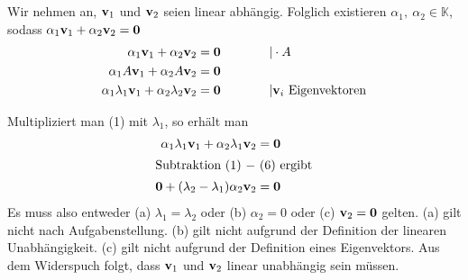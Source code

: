 \documentclass{../mfa}
\begin{document}
\maketitle

\section{}
\subsection{}
Wir nehmen an, $\mathbf{v}_1$ und $\mathbf{v}_2$ seien linear abhängig. Folglich existieren
$\alpha_1,~\alpha_2 \in \mathbb{K}$, sodass $\alpha_1 \mathbf{v}_1 + \alpha_2 \mathbf{v}_2 = \mathbf{0}$
\begin{align}
   \alpha_1 \mathbf{v}_1 + \alpha_2 \mathbf{v}_2 &= \mathbf{0} & \hspace{1cm} & | \cdot A
   \\
   \alpha_1 A \mathbf{v}_1 + \alpha_2 A \mathbf{v}_2 &= \mathbf{0} \\
   \alpha_1 \lambda_1 \mathbf{v}_1 + \alpha_2 \lambda_2 \mathbf{v}_2 &= \mathbf{0} & & | \mathbf{v}_i~\text{Eigenvektoren}
\end{align}

Multipliziert man (1) mit $\lambda_1$, so erhält man \setcounter{equation}{5}
\begin{align}
   \alpha_1 \lambda_1 \mathbf{v}_1 + \alpha_2 \lambda_1 \mathbf{v}_2 &= \mathbf{0} \\
   \intertext{Subtraktion (1) $-$ (6) ergibt}
   \mathbf{0} + (\lambda_2 - \lambda_1)\alpha_2 \mathbf{v}_2 &= \mathbf{0}
\end{align}
Es muss also entweder (a) $\lambda_1 = \lambda_2$ oder (b) $\alpha_2 = 0$ oder
(c) $\mathbf{v}_2 = \mathbf{0}$ gelten. (a) gilt nicht nach Aufgabenstellung. (b) gilt nicht
aufgrund der Definition der linearen Unabhängigkeit. (c) gilt nicht aufgrund der
Definition eines Eigenvektors. Aus dem Widerspuch folgt, dass $\mathbf{v}_1$ und
$\mathbf{v}_2$ linear unabhängig sein müssen.
   
\end{document}
